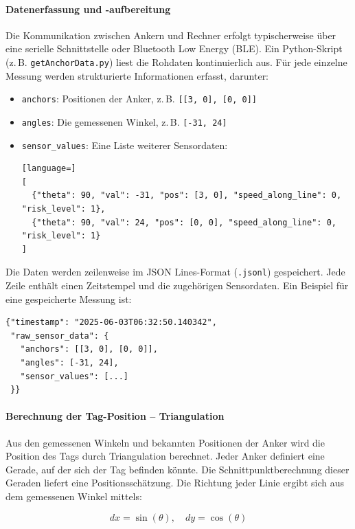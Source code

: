 \documentclass[a4paper, 12pt]{article} %
\begin{document}
\paragraph{Datenerfassung und -aufbereitung}

Die Kommunikation zwischen Ankern und Rechner erfolgt typischerweise über eine serielle Schnittstelle oder Bluetooth Low Energy (BLE). 
Ein Python-Skript (z.\,B. \texttt{getAnchorData.py}) liest die Rohdaten kontinuierlich aus. Für jede einzelne Messung werden strukturierte Informationen
erfasst, darunter:

\begin{itemize}
    \item \texttt{anchors}: Positionen der Anker, z.\,B. \texttt{[[3, 0], [0, 0]]}
    \item \texttt{angles}: Die gemessenen Winkel, z.\,B. \texttt{[-31, 24]}
    \item \texttt{sensor\_values}: Eine Liste weiterer Sensordaten:
\begin{lstlisting}[language=]
[
  {"theta": 90, "val": -31, "pos": [3, 0], "speed_along_line": 0, "risk_level": 1},
  {"theta": 90, "val": 24, "pos": [0, 0], "speed_along_line": 0, "risk_level": 1}
]
\end{lstlisting}
\end{itemize}

Die Daten werden zeilenweise im JSON Lines-Format (\texttt{.jsonl}) gespeichert. Jede Zeile enthält einen Zeitstempel und die zugehörigen Sensordaten. 
Ein Beispiel für eine gespeicherte Messung ist:

\begin{verbatim}
{"timestamp": "2025-06-03T06:32:50.140342", 
 "raw_sensor_data": {
   "anchors": [[3, 0], [0, 0]], 
   "angles": [-31, 24], 
   "sensor_values": [...]
 }}
\end{verbatim}

\paragraph{Berechnung der Tag-Position – Triangulation}

Aus den gemessenen Winkeln und bekannten Positionen der Anker wird die Position des Tags durch Triangulation berechnet. Jeder Anker 
definiert eine Gerade, auf der sich der Tag befinden könnte. Die Schnittpunktberechnung dieser Geraden liefert eine Positionsschätzung. Die Richtung 
jeder Linie ergibt sich aus dem gemessenen Winkel mittels:

\[
dx = \sin(\theta), \quad dy = \cos(\theta)
\]
\end{document}
